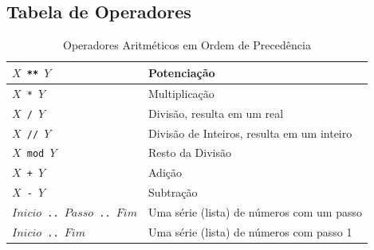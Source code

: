 \subsection{Tabela de Operadores} 
\begin{frame}[fragile]

\begin{footnotesize}
		
	\begin{table}
	\label{Operadores Aritméticos}
		\caption{Operadores Aritméticos em Ordem de Precedência}
		\begin{center}
			\begin{tabular}{ p{2cm}| p{5cm} } \hline
				\texttt{$X$ ** $Y$}  &   Potenciação \\ \hline 
				\texttt{$X$ * $Y$} &     Multiplicação \\ \hline 
				\texttt{$X$ / $Y$} &     Divisão, resulta em um real \\ \hline 
				\texttt{$X$ // $Y$} &    Divisão de Inteiros, resulta em um inteiro \\ \hline 
				\texttt{$X$ mod $Y$} &   Resto da Divisão\\ \hline
				\texttt{$X$ + $Y$} &     Adição \\ \hline 
				\texttt{$X$ - $Y$} &     Subtração \\ \hline 
				{\tt $Inicio$ \verb!..! $Passo$ \verb!..! $Fim$} & Uma série (lista) de números com um passo\\ 
				\hline 
				{\tt $Inicio$ \verb!..! $Fim$}  &   Uma série (lista) de números com passo 1 \\ \hline
			\end{tabular}
		\end{center}
	\end{table}

	\end{footnotesize}

\end{frame}


